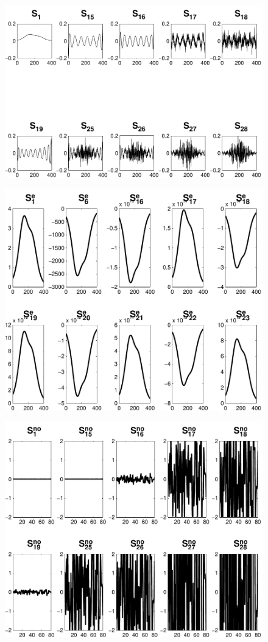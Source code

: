 \documentclass[11pt]{amsart}
\begin{document}
\begin{figure}[htb] 
  \begin{center}
    \includegraphics[width=0.55\linewidth]{figures/run1/sk_plots}
  \end{center}
\caption{}
\label{fig:sk_plots}
\end{figure}
\begin{figure}[htb] 
  \begin{center}
    \includegraphics[width=0.55\linewidth]{figures/run1/exact_parts}
  \end{center}
\caption{}
\label{fig:exact_parts}
\end{figure}
\begin{figure}[htb] 
  \begin{center}
    \includegraphics[width=0.55\linewidth]{figures/run1/noise_parts}
  \end{center}
\caption{}
\label{fig:noise_parts}
\end{figure}
\end{document}
